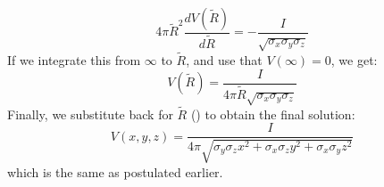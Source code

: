 \begin{equation}
4\pi \tilde{R}^2 \frac{d V(\tilde{R})}{d\tilde{R}} = - \frac{I}{\sqrt{\sigma_x\sigma_y\sigma_z}}
\label{eq:AppAniso:berit2}
\end{equation}
If we integrate this from $\infty$ to $\tilde{R}$, and use that $V(\infty) = 0$, we get:
\begin{equation}
V(\tilde{R}) = \frac{I}{4\pi \tilde{R}\sqrt{\sigma_x\sigma_y\sigma_z}}
\label{eq:AppAniso:berit3}
\end{equation}
Finally, we substitute back for $\tilde{R}$ () to obtain the final solution: 
\begin{equation}
V(x,y,z) = \frac{I}{4 \pi \sqrt{\sigma_y\sigma_z x^2 + \sigma_x\sigma_z y^2 + \sigma_x\sigma_y z^2}}
\label{eq:VC:berit3}
\end{equation}
which is the same as  postulated earlier. 
